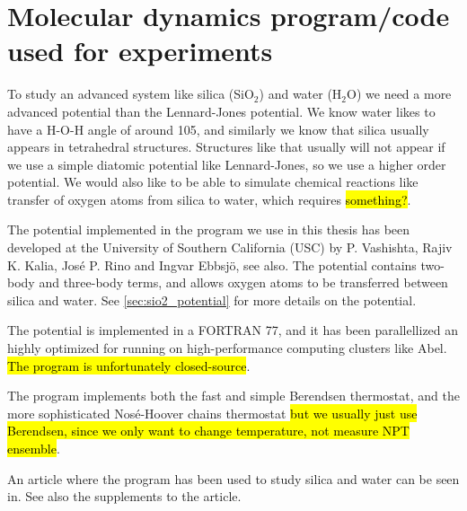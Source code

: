 \chapter{Molecular dynamics program/code used for experiments}
To study an advanced system like silica (SiO$_2$) and water (H$_2$O) we need a more advanced potential than the Lennard-Jones potential. We know water likes to have a H-O-H angle of around 105, and similarly we know that silica usually appears in tetrahedral structures. Structures like that usually will not appear if we use a simple diatomic potential like Lennard-Jones, so we use a higher order potential. We would also like to be able to simulate chemical reactions like transfer of oxygen atoms from silica to water, which requires \hl{something?}.

The potential implemented in the program we use in this thesis has been developed at the University of Southern California (USC) by P. Vashishta, Rajiv K. Kalia, José P. Rino and Ingvar Ebbsj\"o\cite{vashishta1990interaction}, see also\cite{shekhar2013nanobubble,shekhar2013nanobubble_supplements}. The potential contains two-body and three-body terms, and allows oxygen atoms to be transferred between silica and water. See \cref{sec:sio2_potential} for more details on the potential.

The potential is implemented in a FORTRAN 77, and it has been parallellized an highly optimized for running on high-performance computing clusters like Abel. \hl{The program is unfortunately closed-source}.

The program implements both the fast and simple Berendsen thermostat, and the more sophisticated Nos\'e-Hoover chains thermostat \hl{but we usually just use Berendsen, since we only want to change temperature, not measure NPT ensemble}.

An article where the program has been used to study silica and water can be seen in\cite{shekhar2013nanobubble}. See also the supplements to the article\cite{shekhar2013nanobubble_supplements}.





